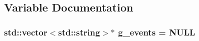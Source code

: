 \subsection{Variable Documentation}
\hypertarget{gtest-listener__test_8cc_a32a264046f3603db11e6fcdaea5fb094}{}
\subsubsection[{g\+\_\+events}]{\setlength{\rightskip}{0pt plus 5cm}std\+::vector$<$std\+::string$>$$\ast$ g\+\_\+events = N\+U\+L\+L}\label{gtest-listener__test_8cc_a32a264046f3603db11e6fcdaea5fb094}
